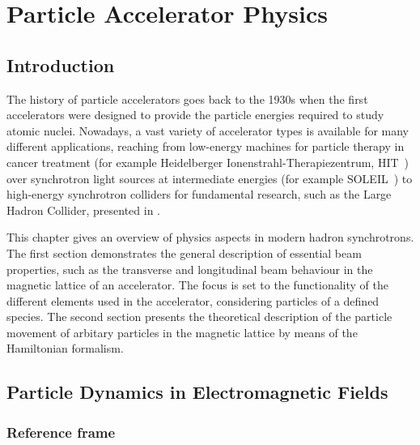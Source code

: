 \chapter{Particle Accelerator Physics}\label{chap:2}
%
\section*{Introduction}
%
The history of particle accelerators goes back to the 1930s when the first accelerators were designed to provide the particle energies required to study atomic nuclei. Nowadays, a vast variety of accelerator types is available for many different applications, reaching from low-energy machines for particle therapy in cancer treatment (for example Heidelberger Ionenstrahl-Therapiezentrum, HIT~\cite{HITref01}) over synchrotron light sources at intermediate energies (for example SOLEIL~\cite{SOLEILref01}) to high-energy synchrotron colliders for fundamental research, such as the Large Hadron Collider, presented in .

This chapter gives an overview of physics aspects in modern hadron synchrotrons. The first section demonstrates the general description of essential beam properties, such as the transverse and longitudinal beam behaviour in the magnetic lattice of an accelerator. The focus is set to the functionality of the different elements used in the accelerator, considering particles of a defined species. The second section presents the theoretical description of the particle movement of arbitary particles in the magnetic lattice by means of the Hamiltonian formalism. 
%

\section{Particle Dynamics in Electromagnetic Fields}

\subsection{Reference frame} \label{chap:refframe}






